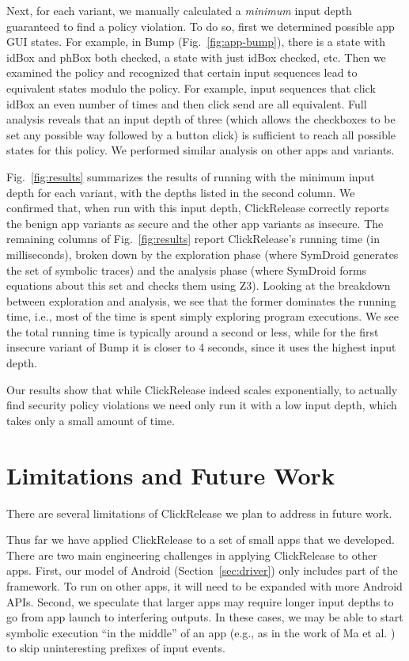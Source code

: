 \documentclass{llncs}
\newcommand{\code}[1]{\textsf{#1}} \newcommand{\bcode}[1]{\texttt{#1}}
\newcommand{\toolname}{ClickRelease\xspace}
\begin{document}
Next, for each variant, we manually
calculated a \emph{minimum} input depth guaranteed
to find a policy violation.
To do so, first we determined possible app GUI states.
For example, in Bump (Fig.~\ref{fig:app-bump}), there is a state with \code{idBox} and
\code{phBox} both checked, a state with just \code{idBox} checked,
etc. Then we examined the policy and recognized that certain input
sequences lead to equivalent states modulo the policy.  For example,
input sequences that click \code{idBox} an even number of times and
then click send are all equivalent. Full analysis reveals that an
input depth of three (which allows the checkboxes to be set any
possible way followed by a button click) is
sufficient to reach all possible states for this policy. We performed
similar analysis on other apps and variants.

Fig.~\ref{fig:results} summarizes the results of running with
the minimum input depth for each variant, with the depths listed in
the second column.
We confirmed that, when run with this input depth, \toolname{}
correctly reports the benign app variants as secure and the other app
variants as insecure.
The remaining columns of Fig.~\ref{fig:results} report \toolname{}'s
running time (in milliseconds), broken down by the
exploration phase (where SymDroid generates the set of symbolic
traces) and the analysis phase (where SymDroid forms equations about
this set and checks them using Z3).  Looking at the breakdown between
exploration and analysis, we see that the former dominates the running
time, i.e., most of the time is spent simply exploring program
executions.  We see the total running time is typically around a
second or less, while for the first insecure variant of Bump it is
closer to 4 seconds, since it uses the highest input depth.

Our results show that while \toolname{} indeed scales exponentially,
to actually find security policy violations we need only run it with a
low input depth, which takes only a small amount of time.

\section{Limitations and Future Work}

There are several limitations of \toolname{} we plan to address
in future work.

Thus far we have applied \toolname{} to a set of small apps that we
developed. There are two main engineering challenges in applying
\toolname{} to other apps. First, our
model of Android (Section~\ref{sec:driver}) only includes part of the
framework. To run on other apps, it will need to be expanded
with more Android APIs. 
Second, we speculate
that larger apps may require longer input depths to go from app launch
to interfering outputs. In these cases, we may be able to start
symbolic execution ``in the middle'' of an app (e.g., as in the
work of Ma et al. \cite{Ma:2011}) to skip uninteresting
prefixes of input events.
\end{document}
